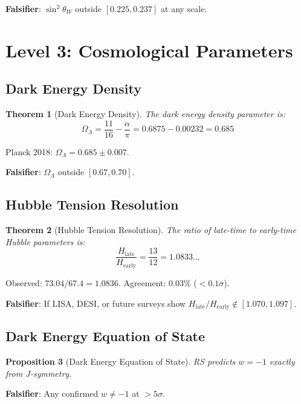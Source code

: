 \documentclass[12pt,a4paper]{article}
\newtheorem{theorem}{Theorem}[section]
\newtheorem{proposition}[theorem]{Proposition}
\theoremstyle{definition}
\theoremstyle{remark}
\begin{document}
\textbf{Falsifier}: $\sin^2\theta_W$ outside $[0.225, 0.237]$ at any scale.

\section{Level 3: Cosmological Parameters}

\subsection{Dark Energy Density}

\begin{theorem}[Dark Energy Density]
The dark energy density parameter is:
\begin{equation}
\Omega_\Lambda = \frac{11}{16} - \frac{\alpha}{\pi} = 0.6875 - 0.00232 = 0.685
\end{equation}
\end{theorem}

Planck 2018: $\Omega_\Lambda = 0.685 \pm 0.007$.

\textbf{Falsifier}: $\Omega_\Lambda$ outside $[0.67, 0.70]$.

\subsection{Hubble Tension Resolution}

\begin{theorem}[Hubble Tension Resolution]
The ratio of late-time to early-time Hubble parameters is:
\begin{equation}
\frac{H_\mathrm{late}}{H_\mathrm{early}} = \frac{13}{12} = 1.0833\ldots
\end{equation}
\end{theorem}

Observed: $73.04/67.4 = 1.0836$. Agreement: $0.03\%$ ($< 0.1\sigma$).

\textbf{Falsifier}: If LISA, DESI, or future surveys show $H_\mathrm{late}/H_\mathrm{early} \notin [1.070, 1.097]$.

\subsection{Dark Energy Equation of State}

\begin{proposition}[Dark Energy Equation of State]
RS predicts $w = -1$ exactly from $J$-symmetry.
\end{proposition}

\textbf{Falsifier}: Any confirmed $w \neq -1$ at $> 5\sigma$.
\end{document}
